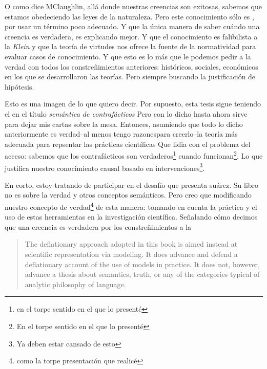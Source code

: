 O como dice MClaughlin, allá donde nuestras creencias son exitosas, sabemos que estamos obedeciendo las leyes de la naturaleza.
Pero este conocimiento sólo es , por usar un término poco adecuado.
Y que la única manera de saber cuándo una creencia es verdadera, es explicando mejor.
Y que el conocimiento es falibilista a la \emph{Klein} y que la teoría de virtudes nos ofrece la fuente de la normatividad para evaluar casos de conocimiento.
Y que esto es lo más que le podemos pedir a la verdad con todos los constreñimientos anteriores: históricos, sociales, económicos en los que se desarrollaron las teorías.
Pero siempre buscando la justificación de hipótesis.

Esto es una imagen de lo que quiero decir.
Por supuesto, esta tesis sigue teniendo el en el título \emph{semántica de contrafácticos}
Pero con lo dicho hasta ahora sirve para dejar mis cartas sobre la mesa.
Entonces, asumiendo que todo lo dicho anteriormente es verdad--al menos tengo razonespara creerlo--la teoría más adecuada para repsentar las prácticas científicas %
Que lidia con el problema del acceso: sabemos que los contrafácticos son verdaderos\footnote{en el torpe sentido en el que lo presenté} cuando funcionan\footnote{En el torpe sentido en el que lo presenté}.
Lo que justifica nuestro conocimiento causal basado en intervenciones\footnote{Ya deben estar cansado de esto}.


En corto, estoy tratando de participar en el desafío que presenta suárez.
Su libro no es sobre la verdad y otros conceptos semánticos.
Pero creo que modificando nuestro concepto de verdad\footnote{como la torpe presentación que realicé} de esta manera: tomando en cuenta la práctica y el uso de estas herramientas en la investigación científica.
Señalando cómo decimos que una creencia es verdadera por los constreñimientos a la %

\begin{quote}
	The deflationary approach adopted in this book is aimed instead at scientific representation via modeling.
	It does advance and defend a deflationary account of the use of models in practice.
	It does not, however, advance  a thesis about semantics, truth, or any of the categories typical of analytic  philosophy of language.
\end{quote}


